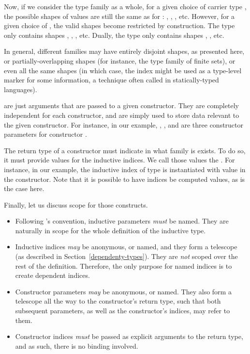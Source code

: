 Now, if we consider the type family  as a whole, for
a given choice of carrier type , the possible shapes of values are
still the same as for : \coqinline{[]}, ,
, etc.  However, for a given choice of , the
valid shapes become restricted by construction.  The type  only contains shapes \coqinline{[]}, ,
, etc.  Dually, the type  only contains shapes , , etc.

In general, different families may have entirely disjoint shapes, as presented
here, or partially-overlapping shapes (for instance, the type family of finite
sets), or even all the same shapes (in which case, the index might be used as a
type-level marker for some information, a technique often called  in statically-typed languages).

 are just arguments that are passed to a given
constructor.  They are completely independent for each constructor, and are
simply used to store data relevant to the given constructor.  For instance, in
our  example, , , and
 are three constructor parameters for constructor .

The return type of a constructor must indicate in what family is exists.  To do
so, it must provide values for the inductive indices.  We call those values the
.  For instance, in our 
example, the inductive index of type  is instantiated with
value  in the  constructor.  Note that
it is possible to have indices be computed values, as is the case here.

Finally, let us discuss scope for those constructs.

\begin{itemize}

\item Following \Coq{}'s convention, inductive parameters \emph{must} be named.
They are naturally in scope for the whole definition of the inductive type.

\item Inductive indices \emph{may} be anonymous, or named, and they form a
telescope (as described in Section~\ref{dependenty-types}).  They are \emph{not}
scoped over the rest of the definition.  Therefore, the only purpose for named
indices is to create dependent indices.

\item Constructor parameters \emph{may} be anonymous, or named.  They also form
a telescope all the way to the constructor's return type, such that both
subsequent parameters, as well as the constructor's indices, may refer to them.

\item Constructor indices \emph{must} be passed as explicit arguments to the
return type, and as such, there is no binding involved.

\end{itemize}
